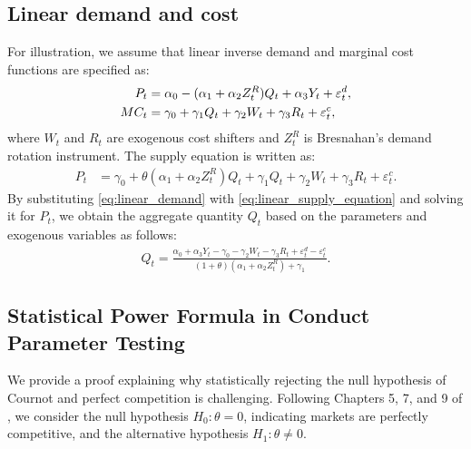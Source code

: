 \documentclass[11pt, a4paper]{article}
\begin{document}
\subsection{Linear demand and cost}
For illustration, we assume that linear inverse demand and marginal cost functions are specified as:
\begin{align}
    P_{t} &= \alpha_0 - (\alpha_1 + \alpha_2Z^{R}_{t})Q_{t} + \alpha_3 Y_{t} + \varepsilon^{d}_{t},\label{eq:linear_demand}\\
    MC_{t} &= \gamma_0  + \gamma_1 Q_{t} + \gamma_2 W_{t} + \gamma_3 R_{t} + \varepsilon^{c}_{t},\label{eq:linear_{t}arginal_cost}
\end{align}
where $W_{t}$ and $R_{t}$ are exogenous cost shifters and $Z^{R}_{t}$ is Bresnahan's demand rotation instrument. 
The supply equation is written as:
\begin{align}
    P_{t} 
    &= \gamma_0 + \theta (\alpha_1 + \alpha_2 Z^{R}_{t})Q_{t} + \gamma_1 Q_{t} + \gamma_2 W_{t} + \gamma_3 R_{t} +\varepsilon^c_{t}.\label{eq:linear_supply_equation}\end{align}
By substituting \eqref{eq:linear_demand} with \eqref{eq:linear_supply_equation} and solving it for $P_{t}$, we obtain the aggregate quantity $Q_{t}$ based on the parameters and exogenous variables as follows:
\begin{align}
    Q_{t} =  \frac{\alpha_0 + \alpha_3 Y_{t} - \gamma_0 - \gamma_2 W_{t} - \gamma_3 R_{t} + \varepsilon^{d}_{t} - \varepsilon^{c}_{t}}{(1 + \theta) (\alpha_1 + \alpha_2 Z^{R}_{t}) + \gamma_1}.\label{eq:quantity_linear}
\end{align}

\subsection{Statistical Power Formula in Conduct Parameter Testing}
We provide a proof explaining why statistically rejecting the null hypothesis of Cournot and perfect competition is challenging. Following Chapters 5, 7, and 9 of \cite{hansen2022econometrics}, we consider the null hypothesis $H_{0}: \theta = 0$, indicating markets are perfectly competitive, and the alternative hypothesis $H_{1}: \theta \neq 0$. 
\end{document}
